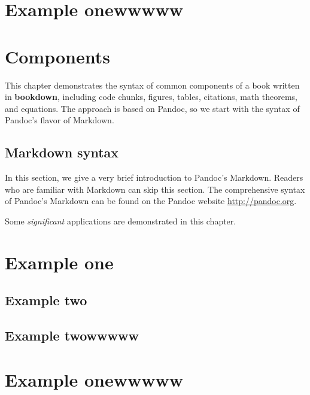 \documentclass[]{krantz}
\begin{document}
\hypertarget{example-onewwwww}{%
\chapter{Example onewwwww}\label{example-onewwwww}}

\hypertarget{components}{%
\chapter{Components}\label{components}}

This chapter demonstrates the syntax of common components of a book written in \textbf{bookdown}, including code chunks, figures, tables, citations, math theorems, and equations. The approach is based on Pandoc, so we start with the syntax of Pandoc's flavor of Markdown.

\hypertarget{markdown-syntax}{%
\section{Markdown syntax}\label{markdown-syntax}}

In this section, we give a very brief introduction to Pandoc's Markdown. Readers who are familiar with Markdown can skip this section. The comprehensive syntax of Pandoc's Markdown can be found on the Pandoc website \url{http://pandoc.org}.

\hypertarget{appendix-apendice}{%
\appendix {}}


Some \emph{significant} applications are demonstrated in this chapter.

\hypertarget{example-one-1}{%
\chapter{Example one}\label{example-one-1}}

\hypertarget{example-two-1}{%
\section{Example two}\label{example-two-1}}

\hypertarget{example-twowwwww-1}{%
\section{Example twowwwww}\label{example-twowwwww-1}}

\hypertarget{example-onewwwww-1}{%
\chapter{Example onewwwww}\label{example-onewwwww-1}}
\end{document}
